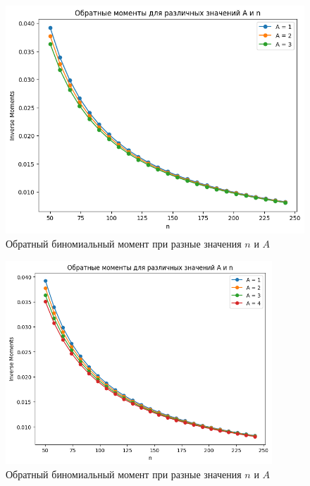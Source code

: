 \documentclass[13pt]{article}
\begin{document}
\vspace{6 mm}
\begin{figure}[htp]
    \centering
    \includegraphics[width=12cm]{images/output3_inverse_binonial.png}
    \caption{ Обратный биномиальный момент при разные значения $n$ и $A$ }
    \label{binom_fig2}
\end{figure}

\vspace{3 mm}
\begin{figure}[htp]
    \centering
    \includegraphics[width=10cm]{images/moment.png}
    \caption{ Обратный биномиальный момент при разные значения $n$ и $A$ }
    \label{binom_fig3}
\end{figure}


\end{document}
